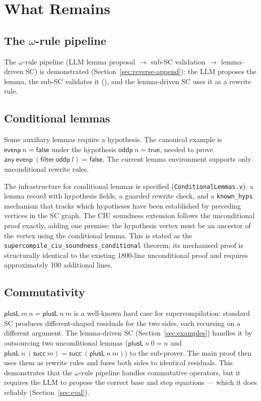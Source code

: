 \section{What Remains}
\label{sec:limits}

\subsection{The $\omega$-rule pipeline}

The $\omega$-rule pipeline (LLM lemma proposal $\to$ sub-SC validation $\to$
lemma-driven SC) is demonstrated (Section~\ref{sec:reverse-append}): the LLM
proposes the lemma, the sub-SC validates it (\vmcompute{}), and the
lemma-driven SC uses it as a rewrite rule.

\subsection{Conditional lemmas}

Some auxiliary lemmas require a hypothesis.  The canonical example is
$\mathsf{evenp}\ n = \mathsf{false}$ under the hypothesis
$\mathsf{oddp}\ n = \mathsf{true}$, needed to prove
$\mathsf{any}\ \mathsf{evenp}\ (\mathsf{filter}\ \mathsf{oddp}\ l)
= \mathsf{false}$.  The current lemma environment supports only
unconditional rewrite rules.

The infrastructure for conditional lemmas is specified
(\texttt{ConditionalLemmas.v}): a lemma record with hypothesis fields, a
guarded rewrite check, and a \texttt{known\_hyps} mechanism that tracks
which hypotheses have been established by preceding vertices in the SC
graph.  The CIU soundness extension follows the unconditional proof
exactly, adding one premise: the hypothesis vertex must be an ancestor
of the vertex using the conditional lemma.  This is stated as the
\texttt{supercompile\_ciu\_soundness\_conditional} theorem; its
mechanised proof is structurally identical to the existing 1800-line
unconditional proof and requires approximately 100 additional lines.

\subsection{Commutativity}

$\mathsf{plusL}\ m\ n = \mathsf{plusL}\ n\ m$ is a well-known hard case for
supercompilation: standard SC produces different-shaped residuals for the two
sides, each recursing on a different argument.  The lemma-driven SC
(Section~\ref{sec:examples}) handles it by outsourcing two unconditional lemmas
($\mathsf{plusL}\ n\ 0 = n$ and
$\mathsf{plusL}\ n\ (\mathsf{succ}\ m) = \mathsf{succ}\ (\mathsf{plusL}\ n\ m)$)
to the sub-prover.  The main proof then uses them as rewrite rules and
fuses both sides to identical residuals.  This demonstrates that the
$\omega$-rule pipeline handles commutative operators, but it
requires the LLM to propose the correct base and step equations --- which
it does reliably (Section~\ref{sec:eval}).

